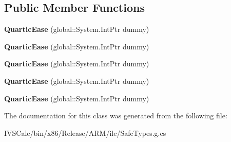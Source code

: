 \subsection*{Public Member Functions}
\begin{DoxyCompactItemize}
\item 
\mbox{\label{class_windows_1_1_u_i_1_1_xaml_1_1_media_1_1_animation_1_1_quartic_ease_aabf462d25338f5a952152e4e2d4d31c5}} 
{\bfseries Quartic\+Ease} (global\+::\+System.\+Int\+Ptr dummy)
\item 
\mbox{\label{class_windows_1_1_u_i_1_1_xaml_1_1_media_1_1_animation_1_1_quartic_ease_aabf462d25338f5a952152e4e2d4d31c5}} 
{\bfseries Quartic\+Ease} (global\+::\+System.\+Int\+Ptr dummy)
\item 
\mbox{\label{class_windows_1_1_u_i_1_1_xaml_1_1_media_1_1_animation_1_1_quartic_ease_aabf462d25338f5a952152e4e2d4d31c5}} 
{\bfseries Quartic\+Ease} (global\+::\+System.\+Int\+Ptr dummy)
\item 
\mbox{\label{class_windows_1_1_u_i_1_1_xaml_1_1_media_1_1_animation_1_1_quartic_ease_aabf462d25338f5a952152e4e2d4d31c5}} 
{\bfseries Quartic\+Ease} (global\+::\+System.\+Int\+Ptr dummy)
\item 
\mbox{\label{class_windows_1_1_u_i_1_1_xaml_1_1_media_1_1_animation_1_1_quartic_ease_aabf462d25338f5a952152e4e2d4d31c5}} 
{\bfseries Quartic\+Ease} (global\+::\+System.\+Int\+Ptr dummy)
\end{DoxyCompactItemize}


The documentation for this class was generated from the following file\+:\begin{DoxyCompactItemize}
\item 
I\+V\+S\+Calc/bin/x86/\+Release/\+A\+R\+M/ilc/Safe\+Types.\+g.\+cs\end{DoxyCompactItemize}
